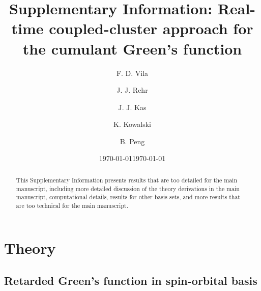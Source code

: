 \documentclass[aps,prb,preprint,groupaddress,floatfix]{revtex4}
\begin{document}
\title{Supplementary Information: Real-time coupled-cluster approach for the cumulant Green's function}
\date{\today}

\author{F. D. Vila}
\author{J. J. Rehr}
\author{J. J. Kas}
\author{K. Kowalski}
\author{B. Peng}

\begin{abstract} 
This Supplementary Information presents results that are too detailed for the main manuscript, including more detailed discussion of the theory derivations in the main manuscript, computational details, results for other basis sets, and more results that are too technical for the main manuscript.
\end{abstract}

\date{\today}

\maketitle

\section{Theory}

\subsection{Retarded Green's function in spin-orbital basis}
\end{document}
